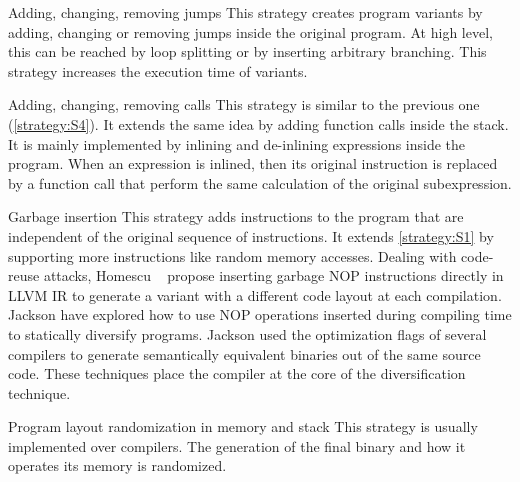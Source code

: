 \begin{strategy}{Adding, changing, removing jumps}
    \label{strategy:S4}
    \normalfont
    This strategy creates program variants by adding, changing or removing jumps inside the original program. At high level, this can be reached by loop splitting or by inserting arbitrary branching. This strategy increases the execution time of variants.
\end{strategy}


\begin{strategy}{Adding, changing, removing calls}
    \label{strategy:S5}
    \normalfont
    This strategy is similar to the previous one (\autoref{strategy:S4}). It extends the same idea by adding function calls inside the stack. It is mainly implemented by inlining and de-inlining expressions inside the program. When an expression is inlined, then its original instruction is replaced by a function call that perform the same calculation of the original subexpression.
\end{strategy}


\begin{strategy}{Garbage insertion}
    \label{strategy:S6}
    \normalfont
    This strategy adds instructions to the program that are independent of the original sequence of instructions. It extends \autoref{strategy:S1} by supporting more instructions like random memory accesses.
    Dealing with code-reuse attacks, Homescu \etal~\cite{homescu2013profile} propose inserting garbage NOP instructions directly in LLVM IR to generate a variant with a different code layout at each compilation. 
    Jackson \etal \cite{jackson} have explored how to use NOP operations inserted during compiling time to statically diversify programs. Jackson \etal \cite{jackson} used  the optimization flags of several compilers to generate semantically equivalent binaries out of the same source code. These techniques place the compiler at the core of the diversification technique. %
\end{strategy}

\begin{strategy}{Program layout randomization in memory and stack}
    \label{strategy:S7}
    \normalfont
    This strategy is usually implemented over compilers. The generation of the final binary and how it operates its memory is randomized.  %
\end{strategy}


